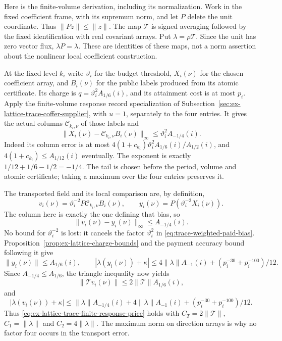 Here is the finite-volume derivation, including its normalization. Work
in the fixed coefficient frame, with its supremum norm, and let $P$ delete
the unit coordinate. Thus $\|Pz\|\le\|z\|$. The map $\mathcal T$ is
signed averaging followed by the fixed identification with real covariant
arrays. Put $\lambda=\rho\mathcal T$. Since the unit has zero vector
flux, $\lambda P=\lambda$. These are identities of these maps, not a
norm assertion about the nonlinear local coefficient construction.

At the fixed level $k_i$ write $\vartheta_i$ for the budget threshold,
$X_i(\nu)$ for the chosen coefficient array, and $B_i(\nu)$ for the
public labels produced from its atomic certificate. Its charge is
$q=\vartheta_i^2 A_{1/6}(i)$, and its attainment cost is at most $p_i$.
Apply the finite-volume response record specialization of
Subsection~\ref{sec:ex-lattice-trace-coffer-supplier}, with $u=1$, separately
to the four entries. It gives the actual columns $\mathcal C_{k_i,\nu}$
of those labels and
\begin{equation}
 \|X_i(\nu)-\mathcal C_{k_i,\nu}B_i(\nu)\|_\infty
 \le \vartheta_i^2 A_{-1/4}(i).
 \label{eq:trace-weighted-paid-bias}
\end{equation}
Indeed its column error is at most
$4(1+c_{k_i})\vartheta_i^2A_{1/6}(i)/A_{1/2}(i)$, and
$4(1+c_{k_i})\le A_{1/12}(i)$ eventually. The exponent is exactly
$1/12+1/6-1/2=-1/4$. The tail is chosen before the period, volume and
atomic certificate; taking a maximum over the four entries preserves it.

The transported field and its local comparison are, by definition,
\[
 v_i(\nu)=\vartheta_i^{-2}P\mathcal C_{k_i,\nu}B_i(\nu),\qquad
 y_i(\nu)=P(\vartheta_i^{-2}X_i(\nu)).
\]
The column here is exactly the one defining that bias, so
\begin{equation}
 \|v_i(\nu)-y_i(\nu)\|_\infty\le A_{-1/4}(i).
 \label{eq:trace-weighted-normalized-bias}
\end{equation}
No bound for $\vartheta_i^{-2}$ is lost: it cancels the factor
$\vartheta_i^2$ in \eqref{eq:trace-weighted-paid-bias}.
Proposition~\ref{prop:ex-lattice-charge-bounds} and the payment accuracy
bound following it give
\[
 \|y_i(\nu)\|\le A_{1/6}(i),\qquad
 |\lambda(y_i(\nu))+\kappa|
 \le4\|\lambda\|A_{-1}(i)
       +(p_i^{-30}+p_i^{-100})/12.
\]
Since $A_{-1/4}\le A_{1/6}$, the triangle inequality now yields
\[
 \|\mathcal T v_i(\nu)\|\le2\|\mathcal T\|A_{1/6}(i),
\]
and
\[
 |\lambda(v_i(\nu))+\kappa|
 \le\|\lambda\|A_{-1/4}(i)+4\|\lambda\|A_{-1}(i)
             +(p_i^{-30}+p_i^{-100})/12.
\]
Thus \eqref{eq:ex-lattice-trace-finite-response-price} holds with
$C_T=2\|\mathcal T\|$, $C_1=\|\lambda\|$ and $C_2=4\|\lambda\|$.
The maximum norm on direction arrays is why no factor four occurs in
the transport error.

